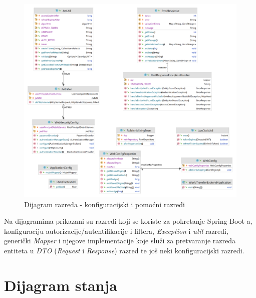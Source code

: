                 \begin{figure}[H]
        			\includegraphics[scale=0.18]{slike/class/class_util_config.png}
        		\centering
        		\caption{Dijagram razreda - konfiguracijski i pomoćni razredi}
        	\end{figure}

			Na dijagramima prikazani su razredi koji se koriste za pokretanje Spring Boot-a, konfiguraciju autorizacije/autentifikacije i filtera, \textit{Exception} i \textit{util} razredi, generički \textit{Mapper} i njegove implementacije koje služi za pretvaranje razreda entiteta u \textit{DTO} (\textit{Request} i \textit{Response}) razred  te još neki konfiguracijski razredi.
            \eject
            
		\section{Dijagram stanja}



            
